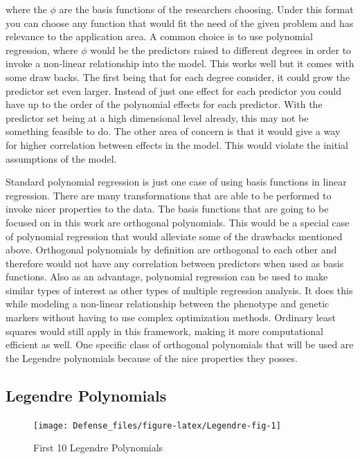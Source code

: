 \documentclass[11pt,]{book}
\theoremstyle{definition}
\theoremstyle{definition}
\theoremstyle{remark}
\begin{document}
where the \(\phi\) are the basis functions of the researchers choosing.
Under this format you can choose any function that would fit the need of
the given problem and has relevance to the application area. A common
choice is to use polynomial regression, where \(\phi\) would be the
predictors raised to different degrees in order to invoke a non-linear
relationship into the model. This works well but it comes with some draw
backs. The first being that for each degree consider, it could grow the
predictor set even larger. Instead of just one effect for each predictor
you could have up to the order of the polynomial effects for each
predictor. With the predictor set being at a high dimensional level
already, this may not be something feasible to do. The other area of
concern is that it would give a way for higher correlation between
effects in the model. This would violate the initial assumptions of the
model.

Standard polynomial regression is just one case of using basis functions
in linear regression. There are many transformations that are able to be
performed to invoke nicer properties to the data. The basis functions
that are going to be focused on in this work are orthogonal polynomials.
This would be a special case of polynomial regression that would
alleviate some of the drawbacks mentioned above. Orthogonal polynomials
by definition are orthogonal to each other and therefore would not have
any correlation between predictors when used as basis functions. Also as
an advantage, polynomial regression can be used to make similar types of
interest as other types of multiple regression analysis. It does this
while modeling a non-linear relationship between the phenotype and
genetic markers without having to use complex optimization methods.
Ordinary least squares would still apply in this framework, making it
more computational efficient as well. One specific class of orthogonal
polynomials that will be used are the Legendre polynomials because of
the nice properties they posses.

\subsection{Legendre Polynomials}\label{legendre-polynomials}

\begin{figure}

{\centering \texttt{[image: Defense\_files/figure-latex/Legendre-fig-1]} 

}

\caption{First 10 Legendre Polynomials}\label{fig:Legendre-fig}
\end{figure}
\end{document}
